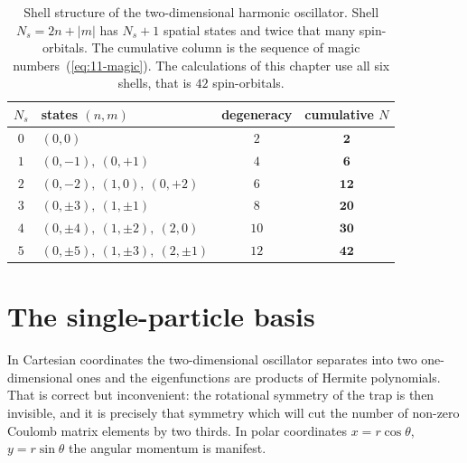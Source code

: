 \begin{table}[h]
\centering
\renewcommand{\arraystretch}{1.25}
\setlength{\tabcolsep}{10pt}
\begin{tabular}{clcc}
\toprule
$N_s$ & states $(n,m)$ & degeneracy & cumulative $N$\\
\midrule
$0$ & $(0,0)$ & $2$ & $\mathbf{2}$\\
$1$ & $(0,-1),\ (0,+1)$ & $4$ & $\mathbf{6}$\\
$2$ & $(0,-2),\ (1,0),\ (0,+2)$ & $6$ & $\mathbf{12}$\\
$3$ & $(0,\pm3),\ (1,\pm1)$ & $8$ & $\mathbf{20}$\\
$4$ & $(0,\pm4),\ (1,\pm2),\ (2,0)$ & $10$ & $\mathbf{30}$\\
$5$ & $(0,\pm5),\ (1,\pm3),\ (2,\pm1)$ & $12$ & $\mathbf{42}$\\
\bottomrule
\end{tabular}
\caption{Shell structure of the two-dimensional harmonic oscillator.  Shell
$N_s=2n+|m|$ has $N_s+1$ spatial states and twice that many spin-orbitals.
The cumulative column is the sequence of magic
numbers~(\ref{eq:11-magic}).  The calculations of this chapter use all six
shells, that is $42$ spin-orbitals.}
\label{tab:11-shells}
\end{table}

\section{The single-particle basis}
\label{sec:qdbasis}

In Cartesian coordinates the two-dimensional oscillator separates into two
one-dimensional ones and the eigenfunctions are products of Hermite
polynomials.  That is correct but inconvenient: the rotational symmetry of the
trap is then invisible, and it is precisely that symmetry which will cut the
number of non-zero Coulomb matrix elements by two thirds.  In polar
coordinates $x=r\cos\theta$, $y=r\sin\theta$ the angular momentum is manifest.

